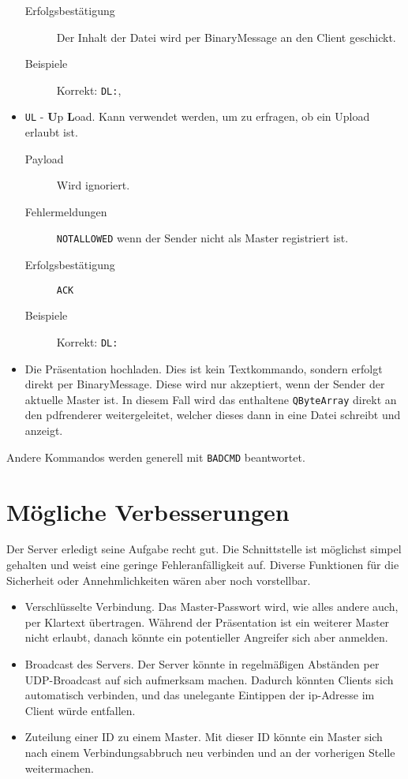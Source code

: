 \begin{itemize}
\begin{description}
			\item [Erfolgsbestätigung] Der Inhalt der Datei wird per BinaryMessage an den Client geschickt.
			\item [Beispiele] Korrekt: \verb+DL:+,
		\end{description}
	\item \verb+UL+ - \textbf{U}p \textbf{L}oad. Kann verwendet werden, um zu erfragen, ob ein Upload erlaubt ist.
		\begin{description}
			\item[Payload] Wird ignoriert.
			\item[Fehlermeldungen] \verb+NOTALLOWED+ wenn der Sender nicht als Master registriert ist.
			\item [Erfolgsbestätigung] \verb+ACK+
			\item [Beispiele] Korrekt: \verb+DL:+
		\end{description}
	\item Die Präsentation hochladen. Dies ist kein Textkommando, sondern erfolgt direkt per BinaryMessage. Diese wird nur akzeptiert, wenn der Sender der aktuelle Master ist. In diesem Fall wird das enthaltene \verb+QByteArray+ direkt an den pdfrenderer weitergeleitet, welcher dieses dann in eine Datei schreibt und anzeigt.
\end{itemize}
Andere Kommandos werden generell mit \verb+BADCMD+ beantwortet.

\section{Mögliche Verbesserungen}
Der Server erledigt seine Aufgabe recht gut. Die Schnittstelle ist möglichst simpel gehalten und weist eine geringe Fehleranfälligkeit auf. Diverse Funktionen für die Sicherheit oder Annehmlichkeiten wären aber noch vorstellbar.

\begin{itemize}
	\item Verschlüsselte Verbindung. Das Master-Passwort wird, wie alles andere auch, per Klartext übertragen. Während der Präsentation ist ein weiterer Master nicht erlaubt, danach könnte ein potentieller Angreifer sich aber anmelden.
	\item Broadcast des Servers. Der Server könnte in regelmäßigen Abständen per UDP-Broadcast auf sich aufmerksam machen. Dadurch könnten Clients sich automatisch verbinden, und das unelegante Eintippen der ip-Adresse im Client würde entfallen.
	\item Zuteilung einer ID zu einem Master. Mit dieser ID könnte ein Master sich nach einem Verbindungsabbruch neu verbinden und an der vorherigen Stelle weitermachen.
\end{itemize}


